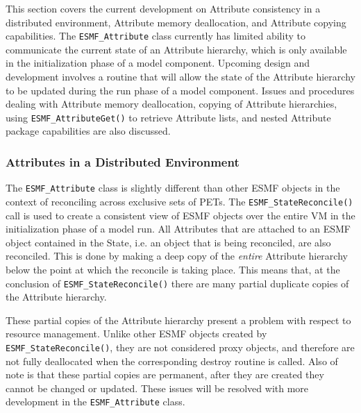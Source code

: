 %

This section covers the current development on Attribute consistency in a distributed environment, Attribute memory deallocation, and Attribute copying capabilities.  The {\tt ESMF\_Attribute} class currently has limited ability to communicate the current state of an Attribute hierarchy, which is only available in the initialization phase of a model component.  Upcoming design and development involves a routine that will allow the state of the Attribute hierarchy to be updated during the run phase of a model component.  Issues and procedures dealing with Attribute memory deallocation, copying of Attribute hierarchies, using {\tt ESMF\_AttributeGet()} to retrieve Attribute lists, and nested Attribute package capabilities are also discussed. 

\subsubsection{Attributes in a Distributed Environment} 
\label{sec:Att:Dist}

The  {\tt ESMF\_Attribute} class is slightly different than other ESMF objects in the context of reconciling across exclusive sets of PETs.  The {\tt ESMF\_StateReconcile()} call is used to create a consistent view of ESMF objects over the entire VM in the initialization phase of a model run.  All Attributes that are attached to an ESMF object contained in the State, i.e. an object that is being reconciled, are also reconciled.  This is done by making a deep copy of the {\it entire} Attribute hierarchy below the point at which the reconcile is taking place.  This means that, at the conclusion of {\tt ESMF\_StateReconcile()} there are many partial duplicate copies of the Attribute hierarchy.

These partial copies of the Attribute hierarchy present a problem with respect to resource management.  Unlike other ESMF objects created by {\tt ESMF\_StateReconcile()}, they are not considered proxy objects, and therefore are not fully deallocated when the corresponding destroy routine is called.  Also of note is that these partial copies are permanent, after they are created they cannot be changed or updated.  These issues will be resolved with more development in the {\tt ESMF\_Attribute} class.

